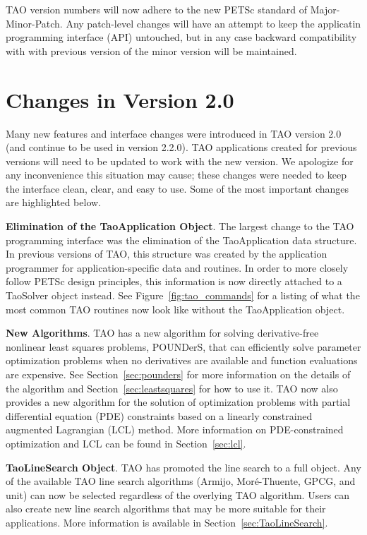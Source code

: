 TAO version numbers will now adhere to the new PETSc standard of 
Major-Minor-Patch. Any patch-level changes will have an attempt to keep the 
applicatin programming interface (API) untouched, but in any case backward 
compatibility with with previous version of the minor version will be 
maintained.
\section*{Changes in Version 2.0}

Many new features and interface changes were introduced in TAO version 2.0 (and continue to be used in version 2.2.0).
TAO applications created for previous versions will need to be updated to 
work with the new version.  We apologize for any inconvenience this situation
may cause; these changes were needed to keep the interface
clean, 
clear, and easy to use. Some of the most important changes are highlighted 
below.

\vspace{7mm}
\noindent \textbf{Elimination of the TaoApplication Object}. The largest change to the TAO programming interface was the elimination of the
TaoApplication data structure. In previous versions of TAO, this structure was 
created by the application programmer for application-specific data and 
routines.  In order to more closely follow PETSc design principles, this 
information is now directly attached to a TaoSolver object instead.  See 
Figure~\ref{fig:tao_commands} for a listing of what the most common TAO 
routines now look like without the TaoApplication object.

\vspace{7mm}
\noindent \textbf{New Algorithms}. TAO has a new algorithm for solving derivative-free nonlinear least
squares
problems, POUNDerS, that can efficiently solve parameter optimization problems 
when no derivatives are available and function evaluations are expensive. 
See 
Section~\ref{sec:pounders} for more information on the details of the 
algorithm and Section~\ref{sec:leastsquares} for how to use it.
TAO now also provides a new algorithm for the solution of optimization
problems with partial differential equation (PDE) constraints based on a
linearly constrained augmented Lagrangian (LCL) method.  More 
information on PDE-constrained optimization and LCL can be found 
in Section~\ref{sec:lcl}.


\vspace{7mm}
\noindent \textbf{TaoLineSearch Object}. TAO has promoted the line search to a full object.  Any of the available 
TAO line search algorithms (Armijo, Mor\'e-Thuente, GPCG, and unit) can now 
be selected regardless of the overlying TAO algorithm.  Users can also
create new line search algorithms that may be more suitable for their
applications.  More information is available in 
Section~\ref{sec:TaoLineSearch}.

